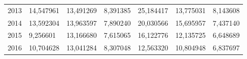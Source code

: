 \begin{table}
\begin{tabular}{p{1cm}p{2cm}p{2cm}p{2cm}p{2cm}p{2cm}p{2cm}}
 2013 &       14,547961 & 13,491269 &  8,391385 &            25,184417 & 13,775031 &                                     8,143608 \\
 2014 &       13,592304 & 13,963597 &  7,890240 &            20,030566 & 15,695957 &                                     7,437140 \\
 2015 &        9,256601 & 13,166680 &  7,615065 &            16,122776 & 12,135725 &                                     6,648689 \\
 2016 &       10,704628 & 13,041284 &  8,307048 &            12,563320 & 10,804948 &                                     6,837697 \\
\bottomrule
\end{tabular}
\end{table}

